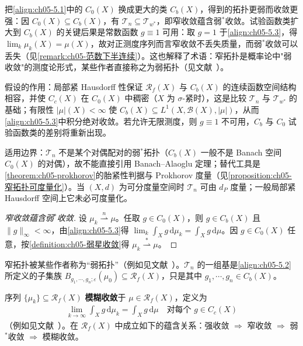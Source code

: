 \documentclass[../../main.tex]{subfiles}%
\begin{document}
\begin{remark}\label{remark:ch05-窄动机}
把\eqref{align:ch05-5.1}中的 $C_0(X)$ 换成更大的类 $C_b(X)$，得到的拓扑更弱而收敛更强：因 $C_0(X)\subseteq C_b(X)$，有 $\mathcal{T}_n\subseteq\mathcal{T}_{w^*}$，即窄收敛蕴含弱$^*$收敛。试验函数类扩大到 $C_b(X)$ 的关键后果是常数函数 $g\equiv1$ 可用：取 $g=1$ 于\eqref{align:ch05-5.3}，得 $\lim_{k}\mu_k(X)=\mu(X)$，故对正测度序列而言窄收敛不丢失质量，而弱$^*$收敛可以丢失（见\cref{remark:ch05-范数下半连续}）。这也解释了术语：窄拓扑是概率论中"弱收敛"的测度论形式，某些作者直接称之为弱拓扑（见文献~\cite{ref45}）。

假设的作用：局部紧 Hausdorff 性保证 $\mathscr{R}_f(X)$ 与 $C_b(X)$ 的连续函数空间结构相容，并使 $C_c(X)$ 在 $C_0(X)$ 中稠密（$X$ 为 $\sigma$-紧时），这是比较 $\mathcal{T}_n$ 与 $\mathcal{T}_{w^*}$ 的基础；有限性 $|\mu|(X)<\infty$ 使 $C_b(X)\subseteq L^1(X,\mathscr{B}(X),|\mu|)$，从而\eqref{align:ch05-5.3}中积分绝对收敛。若允许无限测度，则 $g\equiv1$ 不可用，$C_b$ 与 $C_0$ 试验函数类的差别将重新出现。

适用边界：$\mathcal{T}_n$ 不是某个对偶配对的弱$^*$拓扑（$C_b(X)$ 一般不是 Banach 空间 $C_0(X)$ 的对偶），故不能直接引用 Banach–Alaoglu 定理；替代工具是\cref{theorem:ch05-prokhorov}的胎紧性判据与 Prokhorov 度量（见\cref{proposition:ch05-窄拓扑可度量化}）。当 $(X,d)$ 为可分度量空间时 $\mathcal{T}_n$ 可由 $d_P$ 度量；一般局部紧 Hausdorff 空间上它未必可度量化。
\end{remark}

\begin{proof}[窄收敛蕴含弱$^*$收敛]
设 $\mu_k\stackrel{n}{\rightharpoonup}\mu$。任取 $g\in C_0(X)$，则 $g\in C_b(X)$ 且 $\|g\|_\infty<\infty$，由\eqref{align:ch05-5.3}得 $\lim_{k}\int_X g\,\mathrm{d}\mu_k=\int_X g\,\mathrm{d}\mu$。因 $g\in C_0(X)$ 任意，按\cref{definition:ch05-弱星收敛}得 $\mu_k\stackrel{*}{\rightharpoonup}\mu$。
\end{proof}

窄拓扑被某些作者称为“弱拓扑”（例如见文献~\cite{ref45}）。$\mathcal{T}_n$ 的一组基是\eqref{align:ch05-5.2}所定义的子集族 $B_{g_1,\cdots ,g_n;\varepsilon}(\mu_0)\subseteq\mathscr{R}_f(X)$，只是其中 $g_1,\cdots ,g_n\in C_b(X)$。

\begin{remark}\label{remark:ch05-模糊收敛}
序列 $\{\mu_k\}\subseteq\mathscr{R}_f(X)$ \textbf{模糊收敛}于 $\mu\in\mathscr{R}_f(X)$，定义为
\begin{align*}
\lim_{k\to\infty}\int_X g\,\mathrm{d}\mu_k=\int_X g\,\mathrm{d}\mu
\quad\text{对每个 }g\in C_c(X)
\end{align*}
（例如见文献~\cite{ref42}）。在 $\mathscr{R}_f(X)$ 中成立如下的蕴含关系：强收敛 $\Rightarrow$ 窄收敛 $\Rightarrow$ 弱$^*$收敛 $\Rightarrow$ 模糊收敛。
\end{remark}
\end{document}

